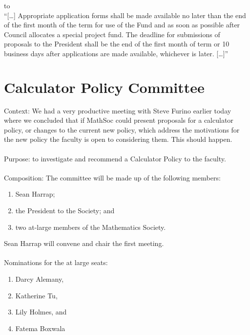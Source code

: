 \documentclass[12pt, letterpaper]{article}
\begin{document}
to\\

“[…] Appropriate application forms shall be made available no later than the end of the first month of the term for use of the Fund and as soon as possible after Council allocates a special project fund. The deadline for submissions of proposals to the President shall be the end of the first month of term or 10 business days after applications are made available, whichever is later. […]”\\

\newpage
{}
\section*{Calculator Policy Committee}
Context: We had a very productive meeting with Steve Furino earlier today where we concluded that if MathSoc could present proposals for a calculator policy, or changes to the current new policy, which address the motivations for the new policy the faculty is open to considering them. This should happen.\\\\
Purpose: to investigate and recommend a Calculator Policy to the faculty. \\\\
Composition: The committee will be made up of the following members:
\begin{enumerate}
	\item Sean Harrap;
	\item the President to the Society; and
	\item two at-large members of the Mathematics Society. 
\end{enumerate}
Sean Harrap will convene and chair the first meeting.\\\\
Nominations for the at large seats:
\begin{enumerate}
	\item Darcy Alemany, 
	\item Katherine Tu, 
	\item Lily Holmes, and 
	\item Fatema Boxwala
\end{enumerate}
\end{document}
